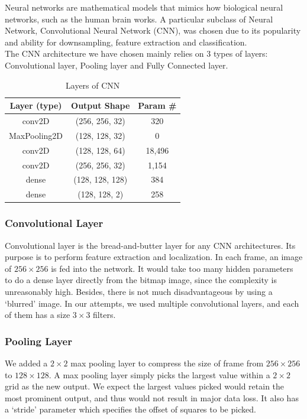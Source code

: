\documentclass[11pt,a4paper]{scrartcl}
\begin{document}
Neural networks are mathematical models that mimics how biological neural networks, such as the human brain works. A particular subclass of Neural Network, Convolutional Neural Network (CNN), was chosen due to its popularity and ability for downsampling, feature extraction and classification.\\

The CNN architecture we have chosen mainly relies on 3 types of layers: Convolutional layer, Pooling layer and Fully Connected layer.

\begin{table}[h]
\centering
\begin{tabular}{ccc}
\toprule
\textbf{Layer (type)} & \textbf{Output Shape} & \textbf{Param \#} \\
\midrule
conv2D & (256, 256, 32) & 320 \\
MaxPooling2D & (128, 128, 32) & 0 \\
conv2D & (128, 128, 64) & 18,496 \\
conv2D & (256, 256, 32) & 1,154 \\
dense & (128, 128, 128) & 384 \\
dense & (128, 128, 2) & 258 \\
\bottomrule
\end{tabular}
\caption{Layers of CNN}
\end{table}
\newpage

\subsubsection{Convolutional Layer}
Convolutional layer is the bread-and-butter layer for any CNN architectures. Its purpose is to perform feature extraction and localization. In each frame, an image of $256 \times 256$ is fed into the network. It would take too many hidden parameters to do a dense layer directly from the bitmap image, since the complexity is unreasonably high. Besides, there is not much disadvantageous by using a `blurred' image. In our attempts, we used multiple convolutional layers, and each of them has a size $3\times 3$ filters. 

\subsubsection{Pooling Layer}
We added a $2\times 2$ max pooling layer to compress the size of frame from $256 \times 256$ to $128 \times 128$. A max pooling layer simply picks the largest value within a $2\times 2$ grid as the new output. We expect the largest values picked would retain the most prominent output, and thus would not result in major data loss. It also has a `stride' parameter which specifies the offset of squares to be picked.
\end{document}
